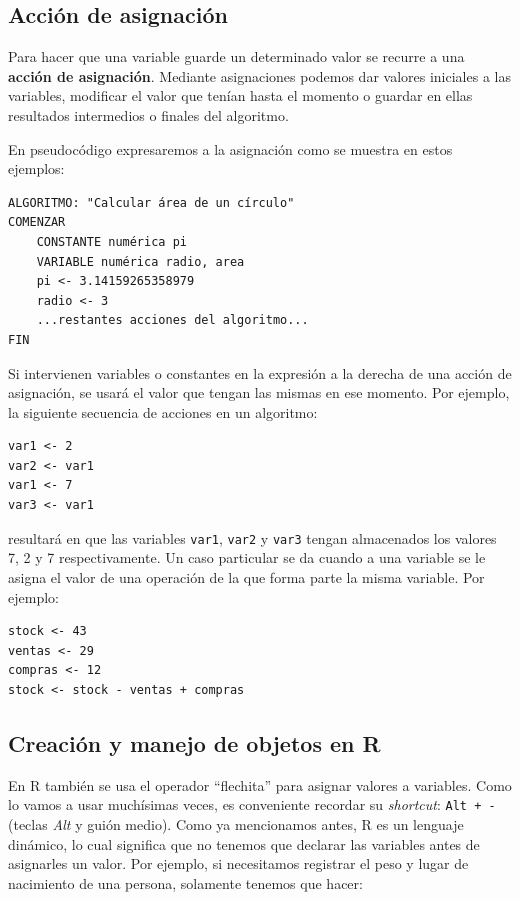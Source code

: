 \documentclass[
]{book}
\begin{document}
\hypertarget{acciuxf3n-de-asignaciuxf3n}{%
\subsection{Acción de asignación}\label{acciuxf3n-de-asignaciuxf3n}}

Para hacer que una variable guarde un determinado valor se recurre a una \textbf{acción de asignación}. Mediante asignaciones podemos dar valores iniciales a las variables, modificar el valor que tenían hasta el momento o guardar en ellas resultados intermedios o finales del algoritmo.

En pseudocódigo expresaremos a la asignación como se muestra en estos ejemplos:

\begin{verbatim}
ALGORITMO: "Calcular área de un círculo"
COMENZAR
    CONSTANTE numérica pi
    VARIABLE numérica radio, area
    pi <- 3.14159265358979
    radio <- 3
    ...restantes acciones del algoritmo...
FIN
\end{verbatim}

Si intervienen variables o constantes en la expresión a la derecha de una acción de asignación, se usará el valor que tengan las mismas en ese momento. Por ejemplo, la siguiente secuencia de acciones en un algoritmo:

\begin{verbatim}
var1 <- 2
var2 <- var1
var1 <- 7
var3 <- var1
\end{verbatim}

resultará en que las variables \texttt{var1}, \texttt{var2} y \texttt{var3} tengan almacenados los valores 7, 2 y 7 respectivamente. Un caso particular se da cuando a una variable se le asigna el valor de una operación de la que forma parte la misma variable. Por ejemplo:

\begin{verbatim}
stock <- 43
ventas <- 29
compras <- 12
stock <- stock - ventas + compras
\end{verbatim}

\hypertarget{creaciuxf3n-y-manejo-de-objetos-en-r}{%
\subsection{Creación y manejo de objetos en R}\label{creaciuxf3n-y-manejo-de-objetos-en-r}}

En R también se usa el operador ``flechita'' para asignar valores a variables. Como lo vamos a usar muchísimas veces, es conveniente recordar su \emph{shortcut}: \texttt{Alt\ +\ -} (teclas \emph{Alt} y guión medio). Como ya mencionamos antes, R es un lenguaje dinámico, lo cual significa que no tenemos que declarar las variables antes de asignarles un valor. Por ejemplo, si necesitamos registrar el peso y lugar de nacimiento de una persona, solamente tenemos que hacer:
\end{document}
